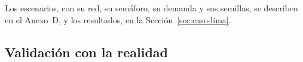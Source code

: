 Los escenarios, con su red, su semáforo, su demanda y sus semillas, se
describen en el Anexo~D, y los resultados, en la
Sección~\ref{sec:caso-lima}.

\subsection{Validación con la realidad}
\label{sec:validacion-realidad}

